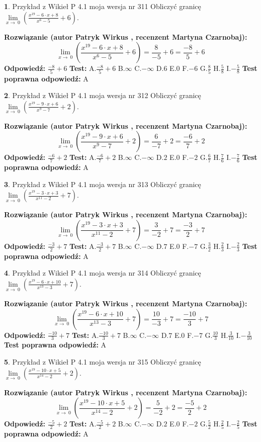\documentclass[12pt, a4paper]{article}
\theoremstyle{definition} %
\newtheorem{zad}{}
\newcommand{\zadStart}[1]{\begin{zad}#1\newline}
\newcommand{\zadStop}{\end{zad}}
\newcommand{\rozwStart}[2]{\noindent \textbf{Rozwiązanie (autor #1 , recenzent #2): }\newline}
\newcommand{\rozwStop}{\newline}
\newcommand{\odpStart}{\noindent \textbf{Odpowiedź:}\newline}
\newcommand{\odpStop}{\newline}
\newcommand{\testStart}{\noindent \textbf{Test:}\newline}
\newcommand{\testStop}{\newline}
\newcommand{\kluczStart}{\noindent \textbf{Test poprawna odpowiedź:}\newline}
\newcommand{\kluczStop}{\newline}
\begin{document}
\zadStart{Przykład z Wikieł P 4.1 moja wersja nr 311}
Obliczyć granicę $\lim\limits_{x\to\ 0}(\frac{x^{19}-6 \cdot x +8}{x^{6}-5}+6)$.
\zadStop
\rozwStart{Patryk Wirkus}{Martyna Czarnobaj}
$$\lim\limits_{x\to\ 0}(\frac{x^{19}-6 \cdot x +8}{x^{6}-5}+6)=\frac{8}{-5}+6=\frac{-8}{5}+6$$
\rozwStop
\odpStart
$\frac{-8}{5}+6$
\odpStop
\testStart
A.$\frac{-8}{5}+6$
B.$\infty$
C.$-\infty$
D.$6$
E.$0$
F.$-6$
G.$\frac{8}{5}$
H.$\frac{5}{8}$
I.$-\frac{5}{8}$
\testStop
\kluczStart
A
\kluczStop



\zadStart{Przykład z Wikieł P 4.1 moja wersja nr 312}
Obliczyć granicę $\lim\limits_{x\to\ 0}(\frac{x^{19}-9 \cdot x +6}{x^{9}-7}+2)$.
\zadStop
\rozwStart{Patryk Wirkus}{Martyna Czarnobaj}
$$\lim\limits_{x\to\ 0}(\frac{x^{19}-9 \cdot x +6}{x^{9}-7}+2)=\frac{6}{-7}+2=\frac{-6}{7}+2$$
\rozwStop
\odpStart
$\frac{-6}{7}+2$
\odpStop
\testStart
A.$\frac{-6}{7}+2$
B.$\infty$
C.$-\infty$
D.$2$
E.$0$
F.$-2$
G.$\frac{6}{7}$
H.$\frac{7}{6}$
I.$-\frac{7}{6}$
\testStop
\kluczStart
A
\kluczStop



\zadStart{Przykład z Wikieł P 4.1 moja wersja nr 313}
Obliczyć granicę $\lim\limits_{x\to\ 0}(\frac{x^{19}-3 \cdot x +3}{x^{11}-2}+7)$.
\zadStop
\rozwStart{Patryk Wirkus}{Martyna Czarnobaj}
$$\lim\limits_{x\to\ 0}(\frac{x^{19}-3 \cdot x +3}{x^{11}-2}+7)=\frac{3}{-2}+7=\frac{-3}{2}+7$$
\rozwStop
\odpStart
$\frac{-3}{2}+7$
\odpStop
\testStart
A.$\frac{-3}{2}+7$
B.$\infty$
C.$-\infty$
D.$7$
E.$0$
F.$-7$
G.$\frac{3}{2}$
H.$\frac{2}{3}$
I.$-\frac{2}{3}$
\testStop
\kluczStart
A
\kluczStop



\zadStart{Przykład z Wikieł P 4.1 moja wersja nr 314}
Obliczyć granicę $\lim\limits_{x\to\ 0}(\frac{x^{19}-6 \cdot x +10}{x^{13}-3}+7)$.
\zadStop
\rozwStart{Patryk Wirkus}{Martyna Czarnobaj}
$$\lim\limits_{x\to\ 0}(\frac{x^{19}-6 \cdot x +10}{x^{13}-3}+7)=\frac{10}{-3}+7=\frac{-10}{3}+7$$
\rozwStop
\odpStart
$\frac{-10}{3}+7$
\odpStop
\testStart
A.$\frac{-10}{3}+7$
B.$\infty$
C.$-\infty$
D.$7$
E.$0$
F.$-7$
G.$\frac{10}{3}$
H.$\frac{3}{10}$
I.$-\frac{3}{10}$
\testStop
\kluczStart
A
\kluczStop



\zadStart{Przykład z Wikieł P 4.1 moja wersja nr 315}
Obliczyć granicę $\lim\limits_{x\to\ 0}(\frac{x^{19}-10 \cdot x +5}{x^{14}-2}+2)$.
\zadStop
\rozwStart{Patryk Wirkus}{Martyna Czarnobaj}
$$\lim\limits_{x\to\ 0}(\frac{x^{19}-10 \cdot x +5}{x^{14}-2}+2)=\frac{5}{-2}+2=\frac{-5}{2}+2$$
\rozwStop
\odpStart
$\frac{-5}{2}+2$
\odpStop
\testStart
A.$\frac{-5}{2}+2$
B.$\infty$
C.$-\infty$
D.$2$
E.$0$
F.$-2$
G.$\frac{5}{2}$
H.$\frac{2}{5}$
I.$-\frac{2}{5}$
\testStop
\kluczStart
A
\kluczStop
\end{document}
